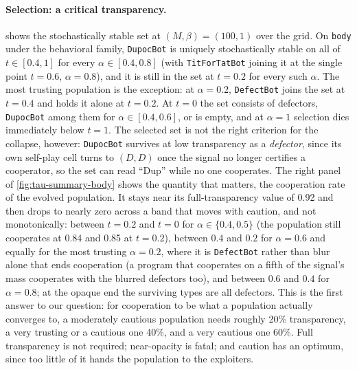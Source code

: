 

\paragraph{Selection: a critical transparency.}
 shows the stochastically stable set at $(M,\beta) = (100,1)$ over the grid. On \texttt{body} under the behavioral family, \texttt{DupocBot} is uniquely stochastically stable on all of $t \in [0.4, 1]$ for every $\alpha \in [0.4, 0.8]$ (with \texttt{TitForTatBot} joining it at the single point $t = 0.6$, $\alpha = 0.8$), and it is still in the set at $t = 0.2$ for every such $\alpha$. The most trusting population is the exception: at $\alpha = 0.2$, \texttt{DefectBot} joins the set at $t = 0.4$ and holds it alone at $t = 0.2$. At $t = 0$ the set consists of defectors, \texttt{DupocBot} among them for $\alpha \in [0.4, 0.6]$, or is empty, and at $\alpha = 1$ selection dies immediately below $t = 1$.
The selected set is not the right criterion for the collapse, however: \texttt{DupocBot} survives at low transparency as a \emph{defector}, since its own self-play cell turns to $(D,D)$ once the signal no longer certifies a cooperator, so the set can read \enquote{Dup} while no one cooperates. The right panel of \cref{fig:tau-summary-body} shows the quantity that matters, the cooperation rate of the evolved population.
It stays near its full-transparency value of 0.92 and then drops to nearly zero across a band that moves with caution, and not monotonically: between $t = 0.2$ and $t = 0$ for $\alpha \in \{0.4, 0.5\}$ (the population still cooperates at 0.84 and 0.85 at $t = 0.2$), between $0.4$ and $0.2$ for $\alpha = 0.6$ and equally for the most trusting $\alpha = 0.2$, where it is \texttt{DefectBot} rather than blur alone that ends cooperation (a program that cooperates on a fifth of the signal's mass cooperates with the blurred defectors too), and between $0.6$ and $0.4$ for $\alpha = 0.8$; at the opaque end the surviving types are all defectors. This is the first answer to our question: for cooperation to be what a population actually converges to, a moderately cautious population needs roughly 20\% transparency, a very trusting or a cautious one 40\%, and a very cautious one 60\%. Full transparency is not required; near-opacity is fatal; and caution has an optimum, since too little of it hands the population to the exploiters.

